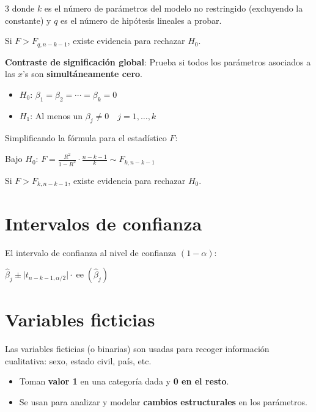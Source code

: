 \documentclass[10pt, a4paper, landscape]{article}
\DeclareMathOperator{\se}{ee}
\begin{document}
\begin{multicols}{3}
donde \( k \) es el número de parámetros del modelo no restringido (excluyendo la constante) y \( q \) es el número de hipótesis lineales a probar.

Si \( F > F_{q, n - k - 1} \), existe evidencia para rechazar \( H_{0} \).

\textbf{Contraste de significación global}: Prueba si todos los parámetros asociados a las \( x \)'s son \textbf{simultáneamente cero}.

\begin{itemize}[leftmargin=*]
	\item \( H_{0}\): \( \beta_{1} = \beta_{2} = \cdots = \beta_{k} = 0 \)
	\item \( H_{1}\): Al menos un \( \beta_{j} \neq 0 \quad j = 1, \ldots, k \)
\end{itemize}

Simplificando la fórmula para el estadístico \( F \):

\begin{center}
	Bajo \( H_{0} \): \quad \( F = \frac{R^{2}}{1 - R^{2}} \cdot \frac{n - k - 1}{k} \sim F_{k, n - k - 1} \)
\end{center}

Si \( F > F_{k, n - k - 1} \), existe evidencia para rechazar \( H_{0} \).

\section*{Intervalos de confianza}

El intervalo de confianza al nivel de confianza \( (1 - \alpha) \):

\begin{center}
	\( \hat{\beta}_{j} \pm \lvert t_{n - k - 1, \alpha / 2} \rvert \cdot \se(\hat{\beta}_{j}) \)
\end{center}

\columnbreak

\section*{Variables ficticias}

Las variables ficticias (o binarias) son usadas para recoger información cualitativa: sexo, estado civil, país, etc.

\begin{itemize}[leftmargin=*]
	\item Toman \textbf{valor 1} en una categoría dada y \textbf{0 en el resto}.
	\item Se usan para analizar y modelar \textbf{cambios estructurales} en los parámetros.
\end{itemize}


\end{multicols}
\end{document}
